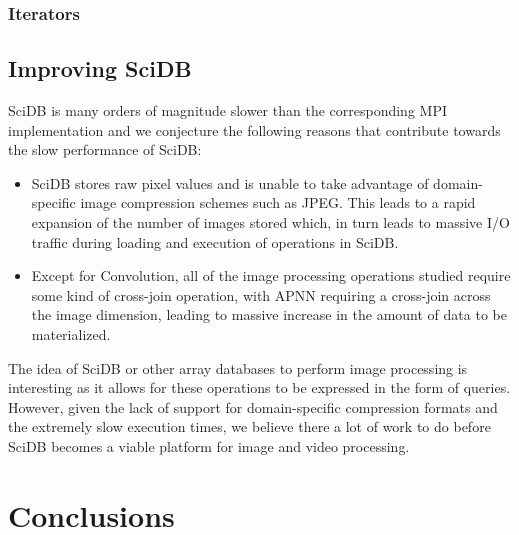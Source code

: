 \documentclass[tog]{acmsiggraph}
\begin{document}
\subsubsection{Iterators}

\subsection{Improving SciDB}
SciDB is many orders of magnitude slower than the corresponding MPI
implementation and we conjecture the following reasons that contribute towards
the slow performance of SciDB:

\begin{itemize}
\item SciDB stores raw pixel values and is unable to take advantage of
domain-specific image compression schemes such as JPEG. This leads to a rapid
expansion of the number of images stored which, in turn leads to massive I/O
traffic during loading and execution of operations in SciDB.
\item Except for Convolution, all of the image processing operations studied
require some kind of cross-join operation, with APNN requiring a cross-join
across the image dimension, leading to massive increase in the amount of data
to be materialized.
\end{itemize}

The idea of SciDB or other array databases to perform image processing is
interesting as it allows for these operations to be expressed in the form of
queries. However, given the lack of support for domain-specific compression
formats and the extremely slow execution times, we believe there a lot of work
to do before SciDB becomes a viable platform for image and video processing.

\section{Conclusions}


\nocite{*}

\end{document}

